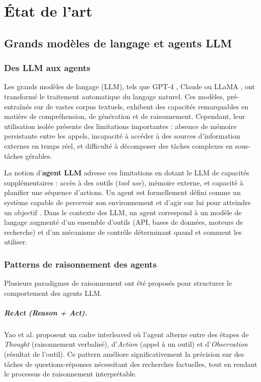 \chapter{État de l'art}
\label{ch:etat_art}

\section{Grands modèles de langage et agents LLM}

\subsection{Des LLM aux agents}

Les grands modèles de langage (LLM), tels que GPT-4 \cite{openai2023gpt4},
Claude \cite{anthropic2024claude} ou LLaMA \cite{touvron2023llama}, ont
transformé le traitement automatique du langage naturel. Ces modèles, pré-entraînés
sur de vastes corpus textuels, exhibent des capacités remarquables en matière de
compréhension, de génération et de raisonnement. Cependant, leur utilisation
isolée présente des limitations importantes : absence de mémoire persistante
entre les appels, incapacité à accéder à des sources d'information externes
en temps réel, et difficulté à décomposer des tâches complexes en sous-tâches
gérables.

La notion d'\textbf{agent LLM} adresse ces limitations en dotant le LLM de
capacités supplémentaires : accès à des outils (\textit{tool use}),
mémoire externe, et capacité à planifier une séquence d'actions. Un agent
est formellement défini comme un système capable de percevoir son environnement
et d'agir sur lui pour atteindre un objectif \cite{wooldridge1995intelligent}.
Dans le contexte des LLM, un agent correspond à un modèle de langage augmenté
d'un ensemble d'outils (API, bases de données, moteurs de recherche) et d'un
mécanisme de contrôle déterminant quand et comment les utiliser.

\subsection{Patterns de raisonnement des agents}

Plusieurs paradigmes de raisonnement ont été proposés pour structurer le
comportement des agents LLM.

\paragraph{ReAct (Reason + Act).}
Yao et al. \cite{yao2022react} proposent un cadre interleaved où l'agent
alterne entre des étapes de \textit{Thought} (raisonnement verbalisé),
d'\textit{Action} (appel à un outil) et d'\textit{Observation} (résultat
de l'outil). Ce pattern améliore significativement la précision sur des
tâches de questions-réponses nécessitant des recherches factuelles,
tout en rendant le processus de raisonnement interprétable.

